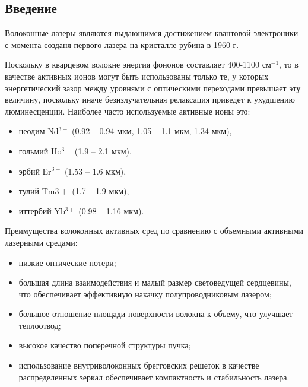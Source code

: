 \documentclass[a4paper, 12pt]{article}
\begin{document}
	\subsection{Введение}
	Волоконные лазеры являются выдающимся достижением квантовой электроники с момента созданя первого лазера на кристалле рубина в 1960 г.\par
	Поскольку в кварцевом волокне энергия фононов составляет 400-1100 см$^{-1}$, то в качестве активных ионов могут быть использованы только те, у которых энергетический зазор между уровнями с оптическими переходами превышает эту величину, поскольку иначе безизлучательная релаксация приведет к ухудшению люминесценции. Наиболее часто используемые активные ионы это:
	\begin{itemize}
		\item неодим Nd$^{3+}$ (0.92 -- 0.94 мкм, 1.05 -- 1.1 мкм, 1.34 мкм),
		\item гольмий Ho$^{3+}$ (1.9 -- 2.1 мкм),
		\item эрбий Er$^{3+}$ (1.53 -- 1.6 мкм),
		\item тулий Tm${3+}$ (1.7 -- 1.9 мкм),
		\item иттербий Yb$^{3+}$ (0.98 -- 1.16 мкм).
	\end{itemize}\par
	Преимущества волоконных активных сред по сравнению с объемными активными лазерными средами:
	\begin{itemize}
		\item низкие оптические потери;
		\item большая длина взаимодействия и малый размер световедущей сердцевины, что обеспечивает эффективную накачку полупроводниковым лазером;
		\item большое отношение площади поверхности волокна к объему, что улучшает теплоотвод;
		\item высокое качество поперечной структуры пучка;
		\item использование внутриволоконных брегговских решеток в качестве распределенных зеркал обеспечивает компактность и стабильность лазера.
	\end{itemize}
\end{document}
